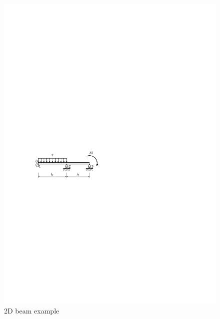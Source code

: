  \begin{figure}[htb]
   \centering
   \includegraphics[scale=1.1]{figures/beam_example}
   \caption{2D beam example}
   \label{fig:structMechMod:exem1_1}
 \end{figure}







